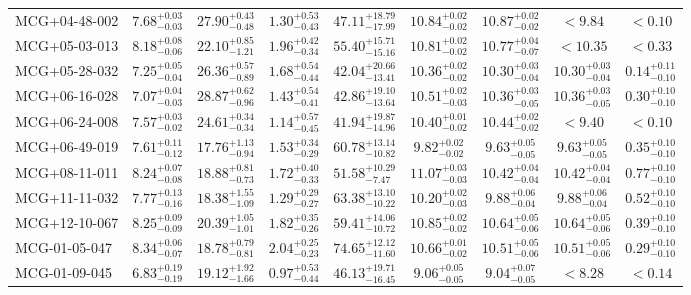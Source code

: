 \documentclass[onecolumn]{mn2e}
\begin{document}
{\begin{center}
\begin{longtable}{lcccccccc}
MCG+04-48-002 & $7.68_{-0.03}^{+0.03}$ & $27.90_{-0.48}^{+0.43}$ & $1.30_{-0.43}^{+0.53}$ &$47.11_{-17.99}^{+18.79}$ & $10.84_{-0.02}^{+0.02}$ & $10.87_{-0.02}^{+0.02}$ & $<9.84$ & $<0.10$ \\
MCG+05-03-013 & $8.18_{-0.06}^{+0.08}$ & $22.10_{-1.21}^{+0.85}$ & $1.96_{-0.34}^{+0.42}$ &$55.40_{-15.16}^{+15.71}$ & $10.81_{-0.02}^{+0.02}$ & $10.77_{-0.07}^{+0.04}$ & $<10.35$ & $<0.33$ \\
MCG+05-28-032 & $7.25_{-0.04}^{+0.05}$ & $26.36_{-0.89}^{+0.57}$ & $1.68_{-0.44}^{+0.54}$ &$42.04_{-13.41}^{+20.66}$ & $10.36_{-0.02}^{+0.02}$ & $10.30_{-0.04}^{+0.03}$ & $10.30_{-0.04}^{+0.03}$ & $0.14_{-0.10}^{+0.11}$ \\
MCG+06-16-028 & $7.07_{-0.03}^{+0.04}$ & $28.87_{-0.96}^{+0.62}$ & $1.43_{-0.41}^{+0.54}$ &$42.86_{-13.64}^{+19.10}$ & $10.51_{-0.03}^{+0.02}$ & $10.36_{-0.05}^{+0.03}$ & $10.36_{-0.05}^{+0.03}$ & $0.30_{-0.10}^{+0.10}$ \\
MCG+06-24-008 & $7.57_{-0.02}^{+0.03}$ & $24.61_{-0.34}^{+0.34}$ & $1.14_{-0.45}^{+0.57}$ &$41.94_{-14.96}^{+19.87}$ & $10.40_{-0.02}^{+0.01}$ & $10.44_{-0.02}^{+0.02}$ & $<9.40$ & $<0.10$ \\
MCG+06-49-019 & $7.61_{-0.12}^{+0.11}$ & $17.76_{-0.94}^{+1.13}$ & $1.53_{-0.29}^{+0.34}$ &$60.78_{-10.82}^{+13.14}$ & $9.82_{-0.02}^{+0.02}$ & $9.63_{-0.05}^{+0.05}$ & $9.63_{-0.05}^{+0.05}$ & $0.35_{-0.10}^{+0.10}$ \\
MCG+08-11-011 & $8.24_{-0.08}^{+0.07}$ & $18.88_{-0.73}^{+0.81}$ & $1.72_{-0.33}^{+0.40}$ &$51.58_{-7.47}^{+10.29}$ & $11.07_{-0.03}^{+0.03}$ & $10.42_{-0.04}^{+0.04}$ & $10.42_{-0.04}^{+0.04}$ & $0.77_{-0.10}^{+0.10}$ \\
MCG+11-11-032 & $7.77_{-0.16}^{+0.13}$ & $18.38_{-1.09}^{+1.55}$ & $1.29_{-0.27}^{+0.29}$ &$63.38_{-10.22}^{+13.10}$ & $10.20_{-0.03}^{+0.02}$ & $9.88_{-0.04}^{+0.06}$ & $9.88_{-0.04}^{+0.06}$ & $0.52_{-0.10}^{+0.10}$ \\
MCG+12-10-067 & $8.25_{-0.09}^{+0.09}$ & $20.39_{-1.01}^{+1.05}$ & $1.82_{-0.26}^{+0.35}$ &$59.41_{-10.72}^{+14.06}$ & $10.85_{-0.02}^{+0.02}$ & $10.64_{-0.06}^{+0.05}$ & $10.64_{-0.06}^{+0.05}$ & $0.39_{-0.10}^{+0.10}$ \\
MCG-01-05-047 & $8.34_{-0.07}^{+0.06}$ & $18.78_{-0.81}^{+0.79}$ & $2.04_{-0.23}^{+0.25}$ &$74.65_{-11.60}^{+12.12}$ & $10.66_{-0.02}^{+0.01}$ & $10.51_{-0.06}^{+0.05}$ & $10.51_{-0.06}^{+0.05}$ & $0.29_{-0.10}^{+0.10}$ \\
MCG-01-09-045 & $6.83_{-0.19}^{+0.19}$ & $19.12_{-1.66}^{+1.92}$ & $0.97_{-0.44}^{+0.53}$ &$46.13_{-16.45}^{+19.71}$ & $9.06_{-0.05}^{+0.05}$ & $9.04_{-0.05}^{+0.07}$ & $<8.28$ & $<0.14$ \\

\end{longtable}
\end{center}}
\end{document}
